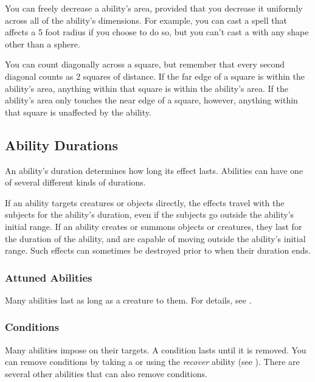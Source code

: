             You can freely decrease a ability's area, provided that you decrease it uniformly across all of the ability's dimensions.
            For example, you can cast a  spell that affects a 5 foot radius if you choose to do so, but you can't cast a  with any shape other than a sphere.

            You can count diagonally across a square, but remember that every second diagonal counts as 2 squares of distance.
            If the far edge of a square is within the ability's area, anything within that square is within the ability's area.
            If the ability's area only touches the near edge of a square, however, anything within that square is unaffected by the ability.

    \subsection{Ability Durations}\label{Ability Durations}

        An ability's duration determines how long its effect lasts.
        Abilities can have one of several different kinds of durations.

        If an ability targets creatures or objects directly, the effects travel with the subjects for the ability's duration, even if the subjects go outside the ability's initial range.
        If an ability creates or summons objects or creatures, they last for the duration of the ability, and are capable of moving outside the ability's initial range.
        Such effects can sometimes be destroyed prior to when their duration ends.

        \subsubsection{Attuned Abilities}
            Many abilities last as long as a creature  to them.
            For details, see .

        \subsubsection{Conditions}\label{Conditions}
            Many abilities impose  on their targets.
            A condition lasts until it is removed.
            You can remove conditions by taking a  or using the \textit{recover} ability (see ).
            There are several other abilities that can also remove conditions.

